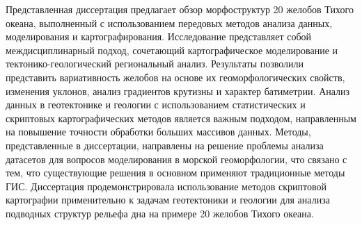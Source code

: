 
Представленная диссертация предлагает обзор морфоструктур 20 желобов Тихого океана, выполненный с использованием передовых методов анализа данных, моделирования и картографирования. Исследование представляет собой междисциплинарный подход, сочетающий картографическое моделирование и тектонико-геологический региональный анализ. Результаты позволили представить вариативность желобов на основе их геоморфологических свойств, изменения уклонов, анализ градиентов крутизны и характер батиметрии. Анализ данных в геотектонике и геологии с использованием статистических и скриптовых картографических методов является важным подходом, направленным на повышение точности обработки больших массивов данных. Методы, представленные в диссертации, направлены на решение проблемы анализа датасетов для вопросов моделирования в морской геоморфологии, что связано с тем, что существующие решения в основном применяют традиционные методы ГИС. Диссертация продемонстрировала использование методов скриптовой картографии применительно к задачам геотектоники и геологии для  анализа подводных структур рельефа дна на примере 20 желобов Тихого океана. 
